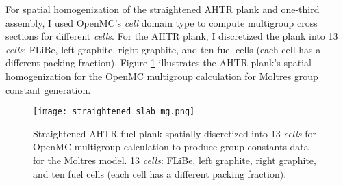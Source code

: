 For spatial homogenization of the straightened \gls{AHTR} plank and 
one-third assembly, I used OpenMC's \textit{cell} domain type to compute 
multigroup cross sections for different \textit{cells}. 
For the \gls{AHTR} plank, I discretized the plank into 13 \textit{cells}:
FLiBe, left graphite, right graphite, and ten fuel cells (each cell has a different 
packing fraction).
Figure \ref{fig:straightened_slab_mg} illustrates the \gls{AHTR} plank's spatial 
homogenization for the OpenMC multigroup calculation for Moltres group constant 
generation. 
\begin{figure}[htbp]
    \centering
    \texttt{[image: straightened\_slab\_mg.png]}
    \raggedright
    \caption{Straightened \acrfull{AHTR} fuel plank spatially discretized into 
    13 \textit{cells} for OpenMC multigroup calculation to produce group constants 
    data for the Moltres model. 13 \textit{cells}:
    FLiBe, left graphite, right graphite, and ten fuel cells (each cell has a different 
    packing fraction).}
    \label{fig:straightened_slab_mg}
\end{figure}

